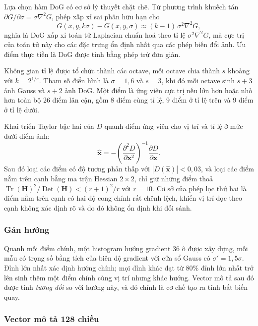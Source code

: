 \documentclass[12pt,a4paper]{article}
\numberwithin{equation}{section}
\begin{document}
Lựa chọn hàm DoG có cơ sở lý thuyết chặt chẽ. Từ phương trình khuếch tán
$\partial G/\partial \sigma = \sigma \nabla^2 G$, phép xấp xỉ sai phân hữu hạn cho
\begin{equation}
G(x,y,k\sigma) - G(x,y,\sigma) \approx (k-1)\,\sigma^{2} \nabla^{2} G,
\end{equation}
nghĩa là DoG xấp xỉ toán tử Laplacian chuẩn hoá theo tỉ lệ $\sigma^2 \nabla^2 G$, mà cực trị của
toán tử này cho các đặc trưng ổn định nhất qua các phép biến đổi ảnh. Ưu điểm thực tiễn là DoG
được tính bằng phép trừ đơn giản.

Không gian tỉ lệ được tổ chức thành các octave, mỗi octave chia thành $s$ khoảng với $k = 2^{1/s}$.
Tham số điển hình là $\sigma = 1{,}6$ và $s = 3$, khi đó mỗi octave sinh $s+3$ ảnh Gauss và $s+2$
ảnh DoG. Một điểm là ứng viên cực trị nếu lớn hơn hoặc nhỏ hơn toàn bộ 26 điểm lân cận, gồm 8 điểm
cùng tỉ lệ, 9 điểm ở tỉ lệ trên và 9 điểm ở tỉ lệ dưới.

Khai triển Taylor bậc hai của $D$ quanh điểm ứng viên cho vị trí và tỉ lệ ở mức dưới điểm ảnh:
\begin{equation}
\hat{\mathbf{x}} = -\left(\frac{\partial^{2} D}{\partial \mathbf{x}^{2}}\right)^{-1}
\frac{\partial D}{\partial \mathbf{x}} .
\end{equation}
Sau đó loại các điểm có độ tương phản thấp với $|D(\hat{\mathbf{x}})| < 0{,}03$, và loại các điểm
nằm trên cạnh bằng ma trận Hessian $2\times2$, chỉ giữ những điểm thoả
$\operatorname{Tr}(\mathbf{H})^{2}/\operatorname{Det}(\mathbf{H}) < (r+1)^{2}/r$ với $r = 10$. Cơ
sở của phép lọc thứ hai là điểm nằm trên cạnh có hai độ cong chính rất chênh lệch, khiến vị trí
dọc theo cạnh không xác định rõ và do đó không ổn định khi đối sánh.

\subsubsection{Gán hướng}

Quanh mỗi điểm chính, một histogram hướng gradient 36 ô được xây dựng, mỗi mẫu có trọng số bằng
tích của biên độ gradient với cửa sổ Gauss có $\sigma' = 1{,}5\sigma$. Đỉnh lớn nhất xác định
hướng chính; mọi đỉnh khác đạt từ $80\%$ đỉnh lớn nhất trở lên sinh thêm một điểm chính cùng vị
trí nhưng khác hướng. Vector mô tả sau đó được tính \textit{tương đối} so với hướng này, và đó
chính là cơ chế tạo ra tính bất biến quay.

\subsubsection{Vector mô tả 128 chiều}
\end{document}
